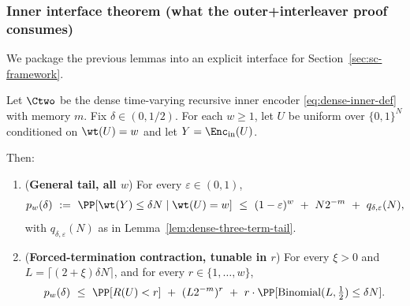\subsubsection{Inner interface theorem (what the outer+interleaver proof consumes)}
\label{subsec:inner-dense-interface}

We package the previous lemmas into an explicit interface for Section~\ref{sec:sc-framework}.

\begin{theorem}
\label{thm:inner-dense-interface}
Let $\Ctwo$ be the dense time-varying recursive inner encoder \eqref{eq:dense-inner-def} with memory $m$.
Fix $\delta\in(0,1/2)$.
For each $w\ge 1$, let $U$ be uniform over $\{0,1\}^N$ conditioned on $\wt(U)=w$ and let $Y=\Enc_{\mathrm{in}}(U)$.

Then:
\begin{enumerate}
\item (\textbf{General tail, all $w$}) For every $\varepsilon\in(0,1)$,
\[
p_w(\delta)\ :=\ \PP[\wt(Y)\le \delta N\mid \wt(U)=w]
\ \le\
(1-\varepsilon)^w\ +\ N2^{-m}\ +\ q_{\delta,\varepsilon}(N),
\]
with $q_{\delta,\varepsilon}(N)$ as in Lemma~\ref{lem:dense-three-term-tail}.
\item (\textbf{Forced-termination contraction, tunable in $r$}) For every $\xi>0$ and
$L=\lceil(2+\xi)\delta N\rceil$, and for every $r\in\{1,\dots,w\}$,
\[
p_w(\delta)
\ \le\
\PP[R(U)<r]\ +\ (L2^{-m})^{r}\ +\ r\cdot \PP[\mathrm{Binomial}(L,\tfrac12)\le \delta N].
\]
\end{enumerate}
\end{theorem}

